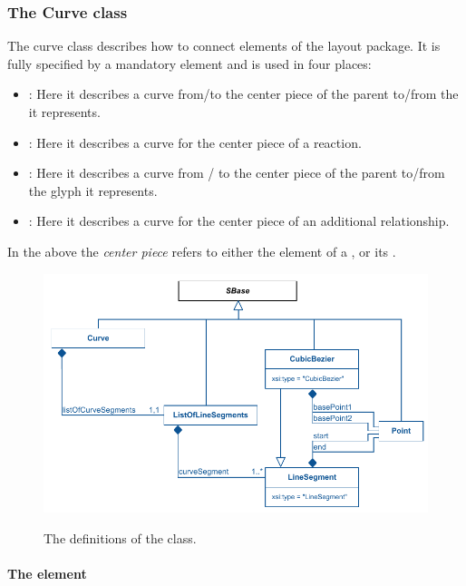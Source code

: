 \subsubsection{The Curve class } \label{curve-class} The curve class 
describes how to connect elements of the layout package. It is fully 
specified by a mandatory  element and is used 
in four places: 

\begin{itemize}

	\item {\SpeciesReferenceGlyph: Here it describes a curve from/to 
	the center piece of the parent \ReactionGlyph to/from the 
	\SpeciesGlyph it represents.}
	\item {\ReactionGlyph: Here it describes a curve for the 
	center piece of a reaction. }	
	\item {\ReferenceGlyph: Here it describes a curve from / to 
	the center piece of the parent \GeneralGlyph to/from the glyph 
	it represents.}
	\item {\GeneralGlyph: Here it describes a curve for the 
	center piece of an additional relationship. }	
	
\end{itemize}

In the above the \textit{center piece} refers to either the \Curve element of a \ReactionGlyph, or its \BoundingBox. 

\begin{figure}[!h]
\includegraphics{uml/layout-curve-uml}\\
\caption{The definitions of the \Curve class.}
\label{uml:curve}
\end{figure}

\paragraph{The  element} 
\label{listofcurvesegments-class} 

